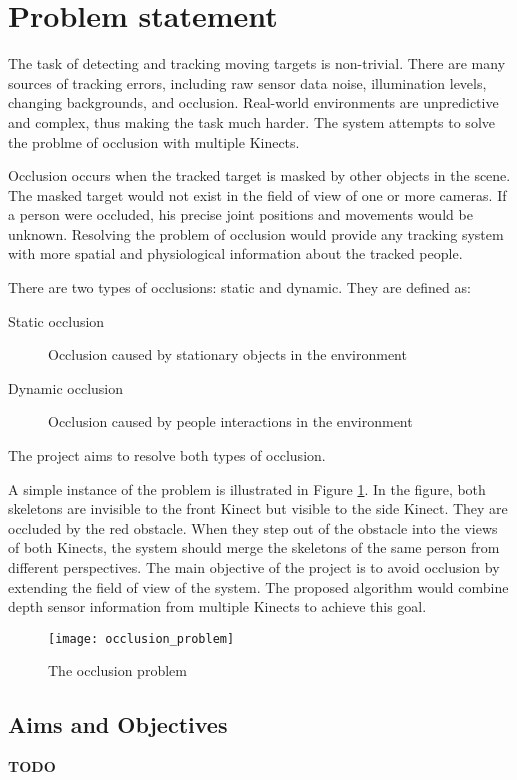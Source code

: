 \section{Problem statement}
\label{sec:problem_statement}

The task of detecting and tracking moving targets is non-trivial. There are many sources of tracking errors, including raw sensor data noise, illumination levels, changing backgrounds, and occlusion. Real-world environments are unpredictive and complex, thus making the task much harder. The system attempts to solve the problme of occlusion with multiple Kinects.

Occlusion occurs when the tracked target is masked by other objects in the scene. The masked target would not exist in the field of view of one or more cameras. If a person were occluded, his precise joint positions and movements would be unknown. Resolving the problem of occlusion would provide any tracking system with more spatial and physiological information about the tracked people.

There are two types of occlusions: static and dynamic. They are defined as:

\begin{description}
  \item[Static occlusion] Occlusion caused by stationary objects in the environment 
  \item[Dynamic occlusion] Occlusion caused by people interactions in the environment
\end{description}

The project aims to resolve both types of occlusion.

A simple instance of the problem is illustrated in Figure \ref{fig:occlusion_problem}. In the figure, both skeletons are invisible to the front Kinect but visible to the side Kinect. They are occluded by the red obstacle. When they step out of the obstacle into the views of both Kinects, the system should merge the skeletons of the same person from different perspectives. The main objective of the project is to avoid occlusion by extending the field of view of the system. The proposed algorithm would combine depth sensor information from multiple Kinects to achieve this goal.

\begin{figure}[!htb]
  \centering
  \texttt{[image: occlusion\_problem]}
  \caption{The occlusion problem}
  \label{fig:occlusion_problem}
\end{figure}

\subsection{Aims and Objectives}

\textbf{TODO}

